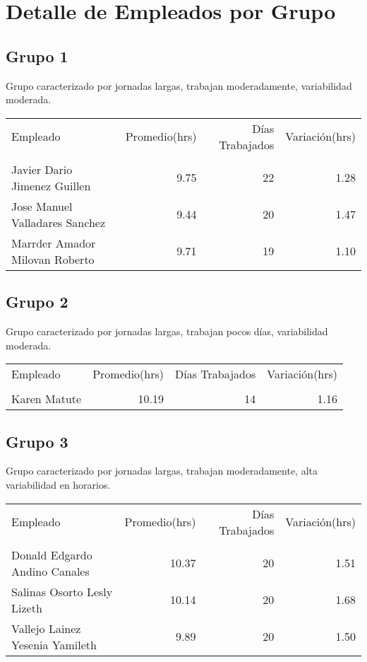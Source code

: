 \documentclass[11pt,a4paper]{article}
\begin{document}
\section{Detalle de Empleados por Grupo}
\subsection*{Grupo 1}
Grupo caracterizado por jornadas largas, trabajan moderadamente, variabilidad moderada.

\begin{tabular}{lrrr}
\toprule
Empleado & Promedio(hrs) & Días Trabajados & Variación(hrs) \\\\
\midrule
Javier Dario  Jimenez Guillen & 9.75 & 22 & 1.28 \\
Jose Manuel Valladares Sanchez & 9.44 & 20 & 1.47 \\
Marrder Amador Milovan Roberto & 9.71 & 19 & 1.10 \\
\bottomrule
\end{tabular}

\subsection*{Grupo 2}
Grupo caracterizado por jornadas largas, trabajan pocos días, variabilidad moderada.

\begin{tabular}{lrrr}
\toprule
Empleado & Promedio(hrs) & Días Trabajados & Variación(hrs) \\\\
\midrule
Karen Matute & 10.19 & 14 & 1.16 \\
\bottomrule
\end{tabular}

\subsection*{Grupo 3}
Grupo caracterizado por jornadas largas, trabajan moderadamente, alta variabilidad en horarios.

\begin{tabular}{lrrr}
\toprule
Empleado & Promedio(hrs) & Días Trabajados & Variación(hrs) \\\\
\midrule
Donald Edgardo Andino Canales & 10.37 & 20 & 1.51 \\
Salinas Osorto Lesly Lizeth & 10.14 & 20 & 1.68 \\
Vallejo Lainez Yesenia Yamileth & 9.89 & 20 & 1.50 \\
\bottomrule
\end{tabular}
\end{document}
